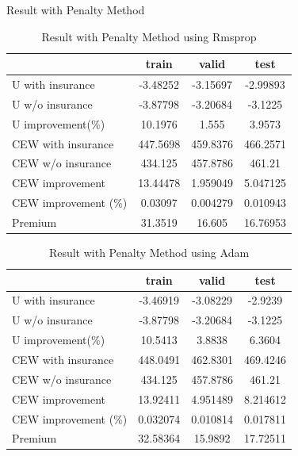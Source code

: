 \documentclass{beamer}
\begin{document}
\begin{frame}[allowframebreaks]{Result with Penalty Method}
\begin{table}[htbp]
  \centering
  \caption{Result with Penalty Method using Rmsprop}
    \begin{tabular}{lccc}
    \hline
          & train & valid & test \\
    \hline
    U with insurance & -3.48252 & -3.15697 & -2.99893 \\
    U w/o insurance & -3.87798 & -3.20684 & -3.1225 \\
    U improvement(\%) & 10.1976 & 1.555 & 3.9573 \\
    CEW with insurance & 447.5698 & 459.8376 & 466.2571 \\
    CEW w/o insurance & 434.125 & 457.8786 & 461.21 \\
    CEW improvement & 13.44478 & 1.959049 & 5.047125 \\
    CEW improvement (\%) & 0.03097 & 0.004279 & 0.010943 \\
    Premium & 31.3519 & 16.605 & 16.76953 \\
    \hline
    \end{tabular}%
  \label{tab:penalty rmsprop}%
\end{table}%
\begin{table}[htbp]
  \centering
  \caption{Result with Penalty Method using Adam}
    \begin{tabular}{lccc}
    \hline
          & train & valid & test \\
    \hline
    U with insurance & -3.46919 & -3.08229 & -2.9239 \\
    U w/o insurance & -3.87798 & -3.20684 & -3.1225 \\
    U improvement(\%) & 10.5413 & 3.8838 & 6.3604 \\
    CEW with insurance & 448.0491 & 462.8301 & 469.4246 \\
    CEW w/o insurance & 434.125 & 457.8786 & 461.21 \\
    CEW improvement & 13.92411 & 4.951489 & 8.214612 \\
    CEW improvement (\%) & 0.032074 & 0.010814 & 0.017811 \\
    Premium & 32.58364 & 15.9892 & 17.72511 \\
    \hline
    \end{tabular}%
  \label{tab:penalty adam}%
\end{table}%


\end{frame}
\end{document}

